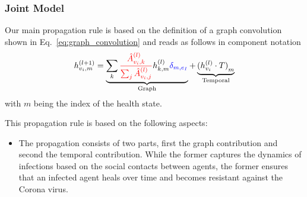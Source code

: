 \subsubsection{Joint Model}

Our main propagation rule is based on the definition of a graph convolution shown in Eq.~\eqref{eq:graph_convolution} and reads as follows in component notation
\begin{equation}
	h_{v_i, m}^{(l+1)}
	=
	\underbrace{
		\sum_k \textcolor{red}{\frac{\hat{A}_{v_i, k}^{(l)}}{\sum_j \hat{A}_{v_i, j}^{(l)}}} h_{k, m}^{(l)} \textcolor{blue}{\delta_{m, e_I}}
	}_{\text{Graph}}
	+
	\underbrace{
		{(h_{v_i}^{(l)}\cdot T)}_m
	}_{\text{Temporal}}
\end{equation}
with $m$ being the index of the health state.

This propagation rule is based on the following aspects:

\begin{itemize}
	\item The propagation consists of two parts, first the graph contribution and second the temporal contribution. While the former captures the dynamics of infections based on the social contacts between agents, the former ensures that an infected agent heals over time and becomes resistant against the Corona virus.
\end{itemize}